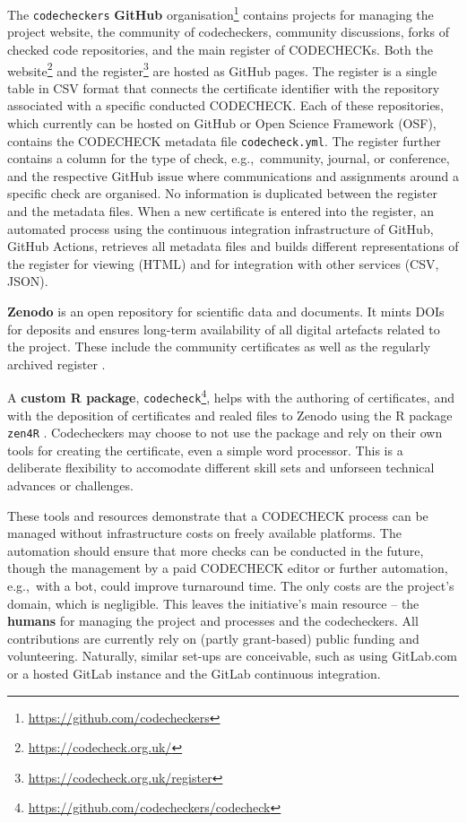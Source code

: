 \documentclass[12pt]{article}
\begin{document}
The \texttt{codecheckers} \textbf{GitHub} organisation\footnote{
\url{https://github.com/codecheckers}} contains projects for managing the
project website, the community of codecheckers, community discussions,
forks of checked code repositories, and the main register of 
CODECHECKs. Both the website\footnote{
\url{https://codecheck.org.uk/}} and the register\footnote{
\url{https://codecheck.org.uk/register}} are hosted as GitHub
pages. The register is a single table in CSV format that
connects the certificate identifier with the repository associated with
a specific conducted CODECHECK. Each of these repositories, which 
currently can be hosted on GitHub or Open Science Framework (OSF), 
contains the CODECHECK metadata file \texttt{codecheck.yml}. The register
further contains a column for the type of check, e.g.,~community, journal,
or conference, and the respective GitHub issue where communications and 
assignments around a specific check are organised. No information is 
duplicated between the register and the metadata files. When a new
certificate is entered into the register, an automated process using the
continuous integration infrastructure of GitHub, GitHub Actions, retrieves
all metadata files and builds different representations of the register
for viewing (HTML) and for integration with other services (CSV, JSON).

\textbf{Zenodo} is an open repository for scientific data and documents. It
mints DOIs for deposits and ensures long-term availability of all digital
artefacts related to the project. These include the community 
certificates as well as the regularly archived register \cite{codecheck_register}.

A \textbf{custom R package}, \texttt{codecheck}\footnote{
\url{https://github.com/codecheckers/codecheck}}, helps with the authoring
of certificates, and with the deposition of certificates and realed files to
Zenodo using the R package \texttt{zen4R} \cite{zen4r}.
Codecheckers may choose to not use the package and rely on their own tools
for creating the certificate, even a simple word processor.
This is a deliberate flexibility to
accomodate different skill sets and unforseen technical advances or
challenges.

These tools and resources demonstrate that a CODECHECK process can be
managed without infrastructure costs on freely available platforms.
The automation should ensure that more checks can
be conducted in the future, though the management by a paid CODECHECK
editor or further automation, e.g.,~with a bot, could improve turnaround time.
The only costs are the project's domain, which is negligible.
This leaves the initiative's main resource -- the \textbf{humans}
for managing the project and processes and the codecheckers.
All contributions are currently rely on (partly grant-based) public funding
and volunteering.
Naturally, similar set-ups are conceivable, such as using GitLab.com or
a hosted GitLab instance and the GitLab continuous integration.
\end{document}
